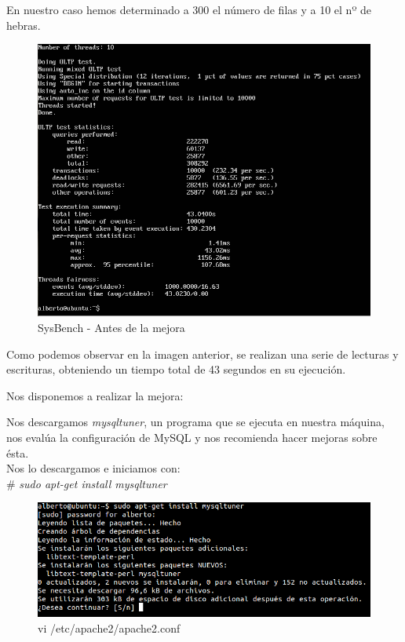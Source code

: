 En nuestro caso hemos determinado a 300 el número de filas y a 10 el nº de hebras.

\begin{figure}[h]
	\centering
	\includegraphics[scale=0.5]{images/antes.png}
	\caption{SysBench - Antes de la mejora}
\end{figure}

Como podemos observar en la imagen anterior, se realizan una serie de lecturas y escrituras, obteniendo un tiempo total de 43 segundos en su ejecución.

\newpage

Nos disponemos a realizar la mejora:

Nos descargamos \textit{mysqltuner}, un programa que se ejecuta en nuestra máquina, nos evalúa la configuración de MySQL y nos recomienda hacer mejoras sobre ésta. \\
Nos lo descargamos e iniciamos con: \\
\# \textit{sudo apt-get install mysqltuner} \\


\begin{figure}[h]
	\centering
	\includegraphics[scale=0.5]{images/mysqlTuner.png}
	\caption{vi /etc/apache2/apache2.conf}
\end{figure} 

